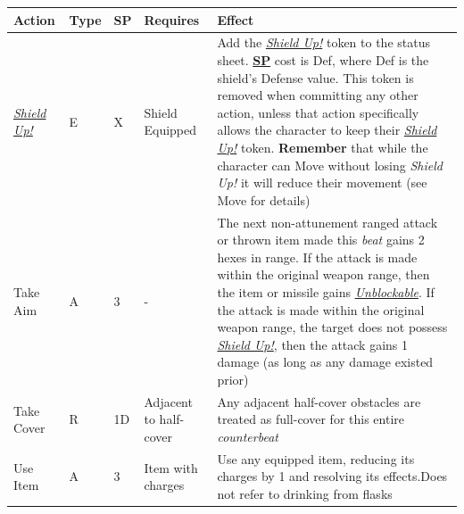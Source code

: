 \documentclass[12pt]{article}
\newcommand{\refto}[1]{\hyperlink{#1}{\textbf{#1}}}
\newcommand{\reftoit}[1]{\hyperlink{#1}{\emph{#1}}}
\begin{document}
\begin{center}
\begin{tabularx}{\textwidth}{p{}p{}p{}p{}p{}}
\hline
\rowcolor{white} \textbf{Action} & \textbf{Type} & \textbf{SP} & \textbf{Requires} & \textbf{Effect}\setcounter{rownum}{0}\\
\hline
\reftoit{Shield Up!} & E & X & Shield Equipped & Add the \reftoit{Shield Up!} token to the status sheet.\newline
\refto{SP} cost is Def, where Def is the shield’s Defense value.\newline
This token is removed when committing any other action, unless that action specifically allows the character to keep their \reftoit{Shield Up!} token.\newline
\textbf{Remember} that while the character can Move without losing \emph{Shield Up!} it will reduce their movement (see Move for details)\\
Take Aim & A & 3 & - & The next non-attunement ranged attack or thrown item made this \emph{beat} gains 2 hexes in range.\newline
If the attack is made within the original weapon range, then the item or missile gains \reftoit{Unblockable}.\newline
If the attack is made within the original weapon range, the target does not possess \reftoit{Shield Up!}, then the attack gains 1 damage (as long as any damage existed prior)\\
Take Cover & R & 1D & Adjacent to half-cover & Any adjacent half-cover obstacles are treated as full-cover for this entire \emph{counterbeat}\\
Use Item & A & 3 & Item with charges & Use any equipped item, reducing its charges by 1 and resolving its effects.\newline Does not refer to drinking from flasks\\
\hline
\end{tabularx}
\end{center}

\pagebreak
\end{document}

